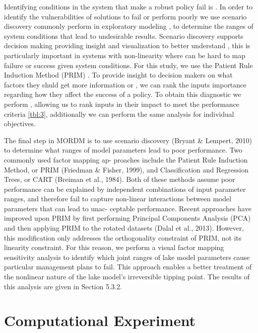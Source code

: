 \documentclass[a4paper,fleqn]{cas-sc}
\begin{document}
Identifying conditions in the system that make a robust policy fail is . In order to identify the vulnerabilities of solutions to fail or perform poorly we use scenario discovery commonly perform in exploratory modeling \citep{}, to determine the ranges of system conditions that lead to undesirable results. Scenario discovery supports decision making providing insight and visualization to better understand , this is particularly important in systems with non-linearity where can be hard to map failure or success given system conditions. For this study, we use the Patient Rule Induction Method (PRIM) \citep{} . To provide insight to decision makers on what factors they shuld get more information or , we can rank the inputs importance regarding how they affect the success of a policy. To obtain this diagnostic we perform , allowing us to rank inputs in their impact to meet the performance criteria \ref{tbl:3}, additionally we can perform the same analysis for individual objectives. 

\citep{kasprzyk_many_2013,quinn_direct_2017}

The ﬁnal step in MORDM is to use scenario discovery (Bryant &
Lempert, 2010) to determine what ranges of model parameters lead
to poor performance. Two commonly used factor mapping ap-
proaches include the Patient Rule Induction Method, or PRIM
(Friedman & Fisher, 1999), and Classiﬁcation and Regression Trees,
or CART (Breiman et al., 1984). Both of these methods assume poor
performance can be explained by independent combinations of
input parameter ranges, and therefore fail to capture non-linear
interactions between model parameters that can lead to unac-
ceptable performance. Recent approaches have improved upon
PRIM by ﬁrst performing Principal Components Analysis (PCA) and
then applying PRIM to the rotated datasets (Dalal et al., 2013).
However, this modiﬁcation only addresses the orthogonality
constraint of PRIM, not its linearity constraint. For this reason, we
perform a visual factor mapping sensitivity analysis to identify
which joint ranges of lake model parameters cause particular
management plans to fail. This approach enables a better treatment
of the nonlinear nature of the lake model's irreversible tipping
point. The results of this analysis are given in Section 5.3.2.


\section{Computational Experiment}
\end{document}
